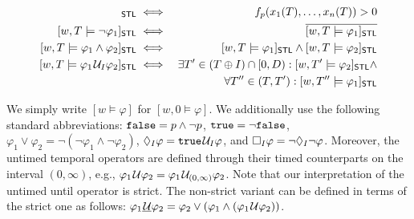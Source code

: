 \small
\begin{align*}
	[w,T \models p]_{\mathsf{STL}} &\iff & f_p(x_1(T), \ldots, x_n(T)) > 0 \\
	[w,T \models \lnot \varphi_1]_{\mathsf{STL}} &\iff & \overline{[w,T \models \varphi_1]_{\mathsf{STL}}} \\
	[w,T \models \varphi_1 \land \varphi_2]_{\mathsf{STL}} &\iff & [w,T \models \varphi_1]_{\mathsf{STL}} \land [w,T \models \varphi_2]_{\mathsf{STL}} \\
	[w,T \models \varphi_1 \until_I \varphi_2]_{\mathsf{STL}} &\iff & \exists T' \in (T \oplus I) \cap [0,D) : [w,T' \models \varphi_2]_{\mathsf{STL}} \land \\
	& & \forall T'' \in (T, T') : [w,T'' \models \varphi_1]_{\mathsf{STL}} \\
\end{align*}
\normalsize

We simply write $[w \models \varphi]$ for $[w,0 \models \varphi]$.
We additionally use the following standard abbreviations: 
$\texttt{false} = p \land \lnot p$,
$\texttt{true} = \lnot \texttt{false}$,
$ \varphi_1 \lor \varphi_2 = \lnot (\lnot \varphi_1 \land \lnot \varphi_2)$,
$\lozenge_I \varphi = \texttt{true} \kern.1em\mathcal{U}_I \varphi$, and
$\square_I \varphi = \lnot \lozenge_I \lnot \varphi$.
Moreover, the untimed temporal operators are defined through their timed counterparts on the interval $(0,\infty)$, e.g., $\varphi_1 \kern.1em\mathcal{U} \varphi_2 = \varphi_1 \kern.1em\mathcal{U}_{(0,\infty)} \varphi_2$.
Note that our interpretation of the untimed until operator is strict.
The non-strict variant can be defined in terms of the strict one as follows: $\varphi_1 \underline{\kern.1em\mathcal{U}} \varphi_2 = \varphi_2 \lor (\varphi_1 \land (\varphi_1 \kern.1em\mathcal{U} \varphi_2))$.

